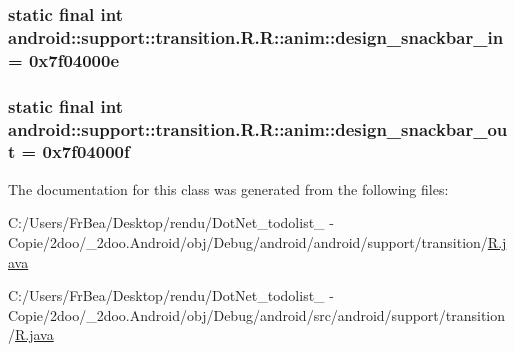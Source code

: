 \hypertarget{classandroid_1_1support_1_1transition_1_1_r_1_1anim_f516e02461dd4a360fb47f190362dc36}{
\subsubsection[{design\_\-snackbar\_\-in}]{\setlength{\rightskip}{0pt plus 5cm}static final int android::support::transition.R.R::anim::design\_\-snackbar\_\-in = 0x7f04000e}}
\label{classandroid_1_1support_1_1transition_1_1_r_1_1anim_f516e02461dd4a360fb47f190362dc36}


\hypertarget{classandroid_1_1support_1_1transition_1_1_r_1_1anim_53a551f74e06275ee11c17b689b4aa48}{
\subsubsection[{design\_\-snackbar\_\-out}]{\setlength{\rightskip}{0pt plus 5cm}static final int android::support::transition.R.R::anim::design\_\-snackbar\_\-out = 0x7f04000f}}
\label{classandroid_1_1support_1_1transition_1_1_r_1_1anim_53a551f74e06275ee11c17b689b4aa48}




The documentation for this class was generated from the following files:\begin{CompactItemize}
\item 
C:/Users/FrBea/Desktop/rendu/DotNet\_\-todolist\_ - Copie/2doo/\_\-2doo.Android/obj/Debug/android/android/support/transition/\hyperlink{android_2support_2transition_2_r_8java}{R.java}\item 
C:/Users/FrBea/Desktop/rendu/DotNet\_\-todolist\_ - Copie/2doo/\_\-2doo.Android/obj/Debug/android/src/android/support/transition/\hyperlink{src_2android_2support_2transition_2_r_8java}{R.java}\end{CompactItemize}
